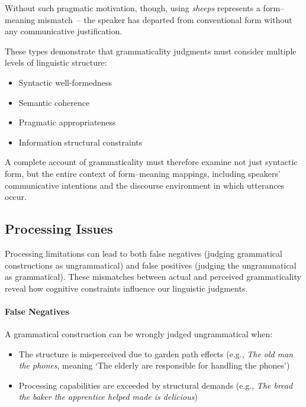 Without such pragmatic motivation, though, using \textit{sheeps} represents a form--meaning mismatch~-- the speaker has departed from conventional form without any communicative justification.

These types demonstrate that grammaticality judgments must consider multiple levels of linguistic structure:
\begin{itemize}[noitemsep]
    \item Syntactic well-formedness
    \item Semantic coherence
    \item Pragmatic appropriateness
    \item Information structural constraints
\end{itemize}

A complete account of grammaticality must therefore examine not just syntactic form, but the entire context of form--meaning mappings, including speakers' communicative intentions and the discourse environment in which utterances occur.

\subsection{Processing Issues}

Processing limitations can lead to both false negatives (judging grammatical constructions as ungrammatical) and false positives (judging the ungrammatical as grammatical). These mismatches between actual and perceived grammaticality reveal how cognitive constraints influence our linguistic judgments.

\paragraph*{False Negatives}
A grammatical construction can be wrongly judged ungrammatical when:
\begin{itemize}[noitemsep]
    \item The structure is misperceived due to garden path effects (e.g., \textit{The old man the phones}, meaning `The elderly are responsible for handling the phones')
    \item Processing capabilities are exceeded by structural demands (e.g., \textit{The bread the baker the apprentice helped made is delicious})
\end{itemize}

